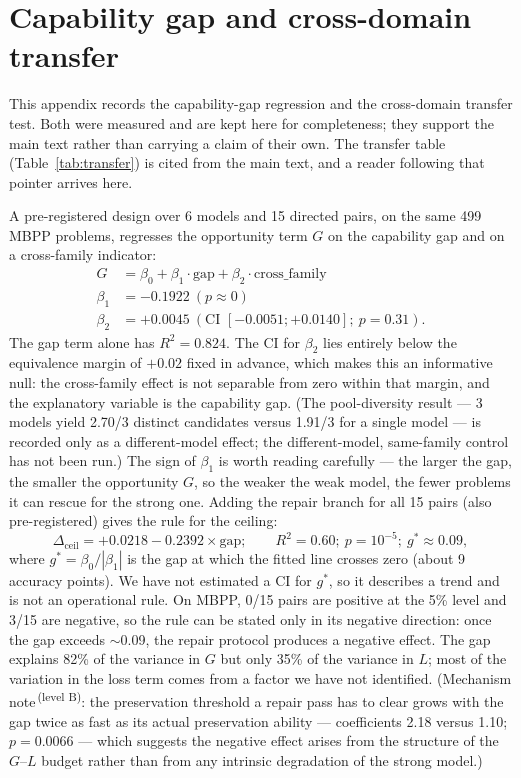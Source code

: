 \documentclass[11pt,a4paper]{article}
\newcommand{\mucB}{\textsuperscript{\,(level B)}}
\newcommand{\dceil}{\Delta_{\mathrm{ceil}}}
\begin{document}
\appendix

\section{Capability gap and cross-domain transfer}\label{sec:termG}\label{sec:transfer}

This appendix records the capability-gap regression and the cross-domain transfer test. Both were measured and are kept here for completeness; they support the main text rather than carrying a claim of their own. The transfer table (Table~\ref{tab:transfer}) is cited from the main text, and a reader following that pointer arrives here.

A pre-registered design over 6 models and 15 directed pairs, on the same 499 MBPP problems, regresses the opportunity term $G$ on the capability gap and on a cross-family indicator:
\begin{align*}
G &= \beta_0 + \beta_1\cdot\text{gap} + \beta_2\cdot\text{cross\_family}\\
\beta_1 &= -0.1922\ (p \approx 0)\\
\beta_2 &= +0.0045\ (\text{CI } [-0.0051;+0.0140];\ p = 0.31).
\end{align*}
The gap term alone has $R^2 = 0.824$. The CI for $\beta_2$ lies entirely below the equivalence margin of $+0.02$ fixed in advance, which makes this an informative null: the cross-family effect is not separable from zero within that margin, and the explanatory variable is the capability gap. (The pool-diversity result --- 3 models yield 2.70/3 distinct candidates versus 1.91/3 for a single model --- is recorded only as a different-model effect; the different-model, same-family control has not been run.) The sign of $\beta_1$ is worth reading carefully --- the larger the gap, the smaller the opportunity $G$, so the weaker the weak model, the fewer problems it can rescue for the strong one. Adding the repair branch for all 15 pairs (also pre-registered) gives the rule for the ceiling:
\begin{equation}\label{eq:rule}
\dceil = +0.0218 - 0.2392 \times \text{gap};\qquad R^2 = 0.60;\ p = 10^{-5};\
g^\ast \approx 0.09,
\end{equation}
where $g^\ast = \beta_0/|\beta_1|$ is the gap at which the fitted line crosses zero (about 9 accuracy points). We have not estimated a CI for $g^\ast$, so it describes a trend and is not an operational rule. On MBPP, 0/15 pairs are positive at the 5\% level and 3/15 are negative, so the rule can be stated only in its negative direction: once the gap exceeds $\sim$0.09, the repair protocol produces a negative effect. The gap explains 82\% of the variance in $G$ but only 35\% of the variance in $L$; most of the variation in the loss term comes from a factor we have not identified. (Mechanism note\mucB: the preservation threshold a repair pass has to clear grows with the gap twice as fast as its actual preservation ability --- coefficients 2.18 versus 1.10; $p=0.0066$ --- which suggests the negative effect arises from the structure of the $G$--$L$ budget rather than from any intrinsic degradation of the strong model.)
\end{document}
